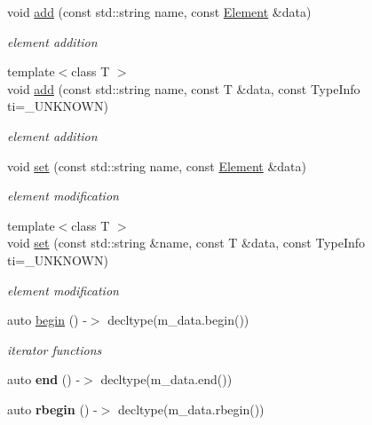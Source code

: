 \begin{DoxyCompactItemize}
\item 
void \hyperlink{classbson_1_1_document_a1fea885e6efb76119b8e75dab2ed1ff2}{add} (const std\+::string name, const \hyperlink{classbson_1_1_element}{Element} \&data)
\begin{DoxyCompactList}\small\item\em element addition \end{DoxyCompactList}\item 
{\footnotesize template$<$class T $>$ }\\void \hyperlink{classbson_1_1_document_af4207bd81fead053e679cbbecaac294e}{add} (const std\+::string name, const T \&data, const Type\+Info ti=\+\_\+\+U\+N\+K\+N\+O\+W\+N)
\begin{DoxyCompactList}\small\item\em element addition \end{DoxyCompactList}\item 
void \hyperlink{classbson_1_1_document_a2dd4dee4cae8930d3f35acb6badf1c9b}{set} (const std\+::string name, const \hyperlink{classbson_1_1_element}{Element} \&data)
\begin{DoxyCompactList}\small\item\em element modification \end{DoxyCompactList}\item 
{\footnotesize template$<$class T $>$ }\\void \hyperlink{classbson_1_1_document_af8c1c129a0b8a21a1ab3a719e9677d0b}{set} (const std\+::string \&name, const T \&data, const Type\+Info ti=\+\_\+\+U\+N\+K\+N\+O\+W\+N)
\begin{DoxyCompactList}\small\item\em element modification \end{DoxyCompactList}\item 
auto \hyperlink{classbson_1_1_document_ae4387eb48d47787eed0a0c7d46214433}{begin} () -\/$>$ decltype(m\+\_\+data.\+begin())
\begin{DoxyCompactList}\small\item\em iterator functions \end{DoxyCompactList}\item 
\hypertarget{classbson_1_1_document_a261933f02ab97f8c3630a6bd978bf72b}{auto {\bfseries end} () -\/$>$ decltype(m\+\_\+data.\+end())}\label{classbson_1_1_document_a261933f02ab97f8c3630a6bd978bf72b}

\item 
\hypertarget{classbson_1_1_document_a8e77cea1e110d8e6c9f1eaec1e762e80}{auto {\bfseries rbegin} () -\/$>$ decltype(m\+\_\+data.\+rbegin())}\label{classbson_1_1_document_a8e77cea1e110d8e6c9f1eaec1e762e80}


\end{DoxyCompactItemize}
